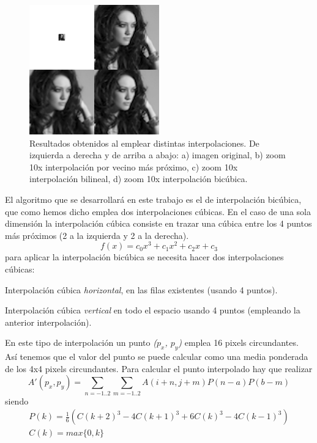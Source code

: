 \documentclass{article}
\begin{document}
\begin{figure}[h]
  \centering
    \includegraphics[width=0.5\textwidth]{img/example.png}
  \caption{Resultados obtenidos al emplear distintas interpolaciones. De izquierda a derecha y de arriba a abajo:
  a) imagen original, b) zoom 10x interpolación por vecino más próximo, c) zoom 10x interpolación bilineal, d) zoom 10x interpolación bicúbica.}
  \label{fig:interpolationExample}
\end{figure}

{\setlength{\parskip}{0mm}
El algoritmo que se desarrollará en este trabajo es el de interpolación bicúbica, que como hemos dicho emplea dos interpolaciones cúbicas. En el caso de una sola dimensión la interpolación cúbica consiste en trazar una cúbica entre los 4 puntos más próximos (2 a la izquierda y 2 a la derecha).
\begin{equation}
\label{eq:interpolacionCubica}
f(x) = c_0 x^3 + c_1 x^2 + c_2 x + c_3
\end{equation}
para aplicar la interpolación bicúbica se necesita hacer dos interpolaciones cúbicas:
\begin{enumerate}{\setlength{\parskip}{0mm}
	\item Interpolación cúbica \emph{horizontal}, en las filas existentes (usando 4 puntos).
	\item Interpolación cúbica \emph{vertical} en todo el espacio usando 4 puntos (empleando la anterior interpolación).
}\end{enumerate}
}

En este tipo de interpolación un punto \emph{($p_x$, $p_y$)} emplea 16 pixels circundantes. Así tenemos que el valor del punto se puede calcular como una media ponderada de los 4x4 pixels circundantes. Para calcular el punto interpolado hay que realizar
\begin{equation}
	A'(p_x ,p_y ) = \sum_{n = -1..2} \sum_{m=-1..2} A(i+n, j+m)P(n-a)P(b-m)
\end{equation}
siendo
\begin{displaymath}
	\begin{matrix}	
		P(k) = \frac{1}{6}(C(k+2)^3 - 4C(k+1)^3 + 6C(k)^3 -4C(k-1)^3) \\
		C(k) = max\lbrace 0, k \rbrace
	\end{matrix}
\end{displaymath}
\end{document}
